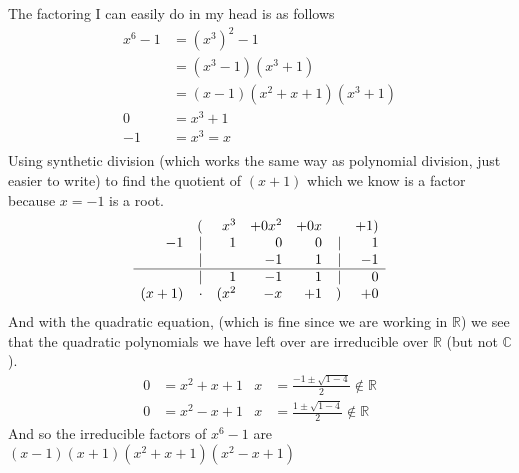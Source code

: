 \documentclass[letterpaper]{article}
\begin{document}
\begin{enumerate}
\begin{enumerate}
    The factoring I can easily do in my head is as follows
    \begin{align*}
      x^6-1&=(x^3)^2-1\\
      &=(x^3-1)(x^3+1)\\
      &=(x-1)(x^2+x+1)(x^3+1)\\
      0&=x^3+1\\
      -1&=x^3=x\\
    \end{align*}
    Using synthetic division (which works the same way as polynomial division, just easier to write) to find the quotient of $(x+1)$ which we know is a factor because $x=-1$ is a root.
    \[\begin{array}{rrrrrrr}
      &(&x^3&+0x^2&+0x&&+1)\\
      -1&|&1&0&0&|&1\\
      &|&&-1&1&|&-1\\
    \hline
    &|&1&-1&1&|&0\\
    (x+1)&\cdot&(x^2&-x&+1&)&+0
    \end{array}\]
    And with the quadratic equation, (which is fine since we are working in $\mathbb{R}$) we see that the quadratic polynomials we have left over are irreducible over $\mathbb{R}$ (but not $\mathbb{C}$).
    \begin{align*}
      0&=x^2+x+1&
      x&=\frac{-1\pm \sqrt{1-4}}{2}\not\in \mathbb{R}\\
      0&=x^2-x+1&
      x&=\frac{1\pm\sqrt{1-4}}{2}\not\in \mathbb{R}
    \end{align*}
    And so the irreducible factors of $x^6-1$ are $(x-1)(x+1)(x^2+x+1)(x^2-x+1)$
  \end{enumerate}
\end{enumerate}
\end{document}
